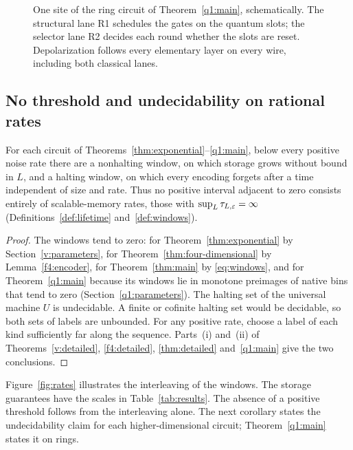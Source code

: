 \begin{figure}[!tb]
\centering
\caption{One site of the ring circuit of Theorem~\ref{q1:main}, schematically. The structural lane R1 schedules the gates on the quantum slots; the selector lane R2 decides each round whether the slots are reset. Depolarization follows every elementary layer on every wire, including both classical lanes.}\label{fig:ring}
\end{figure}

\subsection{No threshold and undecidability on rational rates}\label{intro:threshold}
\begin{corollary}\label{cor:no-threshold}
For each circuit of Theorems~\ref{thm:exponential}--\ref{q1:main}, below every positive noise rate there are a nonhalting window, on which storage grows without bound in \(L\), and a halting window, on which every encoding forgets after a time independent of size and rate. Thus no positive interval adjacent to zero consists entirely of scalable-memory rates, those with \(\sup_L\tau_{L,\varepsilon}=\infty\) (Definitions~\ref{def:lifetime} and~\ref{def:windows}).
\end{corollary}
\begin{proof}
The windows tend to zero: for Theorem~\ref{thm:exponential} by Section~\ref{v:parameters}, for Theorem~\ref{thm:four-dimensional} by Lemma~\ref{f4:encoder}, for Theorem~\ref{thm:main} by \eqref{eq:windows}, and for Theorem~\ref{q1:main} because its windows lie in monotone preimages of native bins that tend to zero (Section~\ref{q1:parameters}). The halting set of the universal machine \(U\) is undecidable. A finite or cofinite halting set would be decidable, so both sets of labels are unbounded. For any positive rate, choose a label of each kind sufficiently far along the sequence. Parts~(i) and~(ii) of Theorems~\ref{v:detailed}, \ref{f4:detailed}, \ref{thm:detailed} and~\ref{q1:main} give the two conclusions.
\end{proof}
Figure~\ref{fig:rates} illustrates the interleaving of the windows. The storage guarantees have the scales in Table~\ref{tab:results}. The absence of a positive threshold follows from the interleaving alone. The next corollary states the undecidability claim for each higher-dimensional circuit; Theorem~\ref{q1:main} states it on rings.

